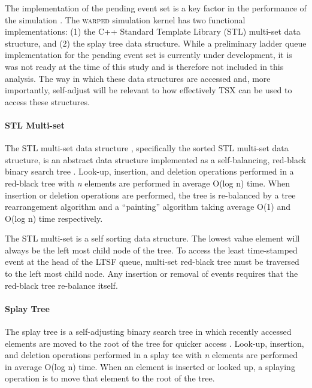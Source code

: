 \documentclass[11pt]{book}
\begin{document}
The implementation of the pending event set is a key factor in the performance of the
simulation \cite{twpes}.  The \textsc{warped} simulation kernel has two functional
implementations: (1) the C++ Standard Template Library (STL) multi-set data structure, and
(2) the splay tree data structure.  While a preliminary ladder queue \cite{tang-05}
implementation for the pending event set is currently under development, it is was not ready
at the time of this study and is therefore not included in this analysis.  The way in
which these data structures are accessed and, more importantly, self-adjust will be
relevant to how effectively TSX can be used to access these structures.

\paragraph{STL Multi-set}

The STL multi-set data structure , specifically the sorted STL multi-set data structure,
is an abstract data structure implemented as a self-balancing, red-black binary search
tree \cite{redblack}.  Look-up, insertion, and deletion operations performed in a
red-black tree with \emph{n} elements are performed in average O(log n) time.  When
insertion or deletion operations are performed, the tree is re-balanced by a tree
rearrangement algorithm and a ``painting'' algorithm taking average O(1) and O(log n) time
respectively.

The STL multi-set is a self sorting data structure.  The lowest value element will always
be the left most child node of the tree.  To access the least time-stamped event at the
head of the LTSF queue, multi-set red-black tree must be traversed to the left most child
node.  Any insertion or removal of events requires that the red-black tree re-balance
itself.

\paragraph{Splay Tree}

The splay tree is a self-adjusting binary search tree in which recently accessed elements
are moved to the root of the tree for quicker access \cite{splaytree}.  Look-up,
insertion, and deletion operations performed in a splay tee with \emph{n} elements are
performed in average O(log n) time.  When an element is inserted or looked up, a splaying
operation is to move that element to the root of the tree.
\end{document}
